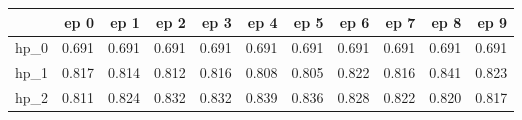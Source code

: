 \begin{tabular}{lrrrrrrrrrr}
\toprule
{} &   ep 0 &   ep 1 &   ep 2 &   ep 3 &   ep 4 &   ep 5 &   ep 6 &   ep 7 &   ep 8 &   ep 9 \\
\midrule
hp\_0 &  0.691 &  0.691 &  0.691 &  0.691 &  0.691 &  0.691 &  0.691 &  0.691 &  0.691 &  0.691 \\
hp\_1 &  0.817 &  0.814 &  0.812 &  0.816 &  0.808 &  0.805 &  0.822 &  0.816 &  0.841 &  0.823 \\
hp\_2 &  0.811 &  0.824 &  0.832 &  0.832 &  0.839 &  0.836 &  0.828 &  0.822 &  0.820 &  0.817 \\
\bottomrule
\end{tabular}
